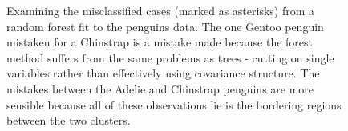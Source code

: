 \documentclass[
  letterpaper,
]{krantz}
\begin{document}
\begin{figure}

\begin{minipage}[t]{0.50\linewidth}

{\centering 


}

\end{minipage}%
%
\begin{minipage}[t]{0.50\linewidth}

{\centering 


}

\end{minipage}%

\caption{\label{fig-p-errors-pdf}Examining the misclassified cases
(marked as asterisks) from a random forest fit to the penguins data. The
one Gentoo penguin mistaken for a Chinstrap is a mistake made because
the forest method suffers from the same problems as trees - cutting on
single variables rather than effectively using covariance structure. The
mistakes between the Adelie and Chinstrap penguins are more sensible
because all of these observations lie is the bordering regions between
the two clusters.}

\end{figure}
\end{document}
